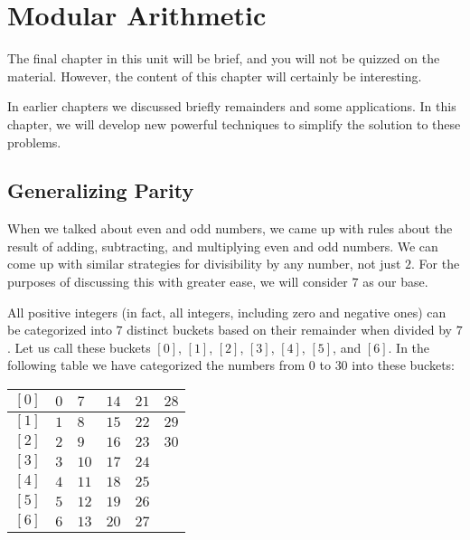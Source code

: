 \documentclass[a4paper,10pt]{report}
\begin{document}
\chapter{Modular Arithmetic}

The final chapter in this unit will be brief, and you will not be quizzed on
the material. However, the content of this chapter will certainly be
interesting.

In earlier chapters we discussed briefly remainders and some applications. In
this chapter, we will develop new powerful techniques to simplify the solution
to these problems.

\section{Generalizing Parity}

When we talked about even and odd numbers, we came up with rules about the
result of adding, subtracting, and multiplying even and odd numbers. We can
come up with similar strategies for divisibility by any number, not just \(2\).
For the purposes of discussing this with greater ease, we will consider \(7\)
as our base.

All positive integers (in fact, all integers, including zero and negative ones)
can be categorized into \(7\) distinct buckets based on their remainder when
divided by \(7\). Let us call these buckets \([0]\), \([1]\), \([2]\), \([3]\),
\([4]\), \([5]\), and \([6]\). In the following table we have categorized the
numbers from \(0\) to \(30\) into these buckets:

\begin{center}
 \begin{tabular}{|c|lllll|}
  \hline
  \([0]\) & \(0\) & \(7\) & \(14\) & \(21\) & \(28\) \\ \hline
  \([1]\) & \(1\) & \(8\) & \(15\) & \(22\) & \(29\) \\ \hline
  \([2]\) & \(2\) & \(9\) & \(16\) & \(23\) & \(30\) \\ \hline
  \([3]\) & \(3\) & \(10\) & \(17\) & \(24\) & \\ \hline
  \([4]\) & \(4\) & \(11\) & \(18\) & \(25\) & \\ \hline
  \([5]\) & \(5\) & \(12\) & \(19\) & \(26\) & \\ \hline
  \([6]\) & \(6\) & \(13\) & \(20\) & \(27\) & \\ \hline
 \end{tabular}
\end{center}
\end{document}

